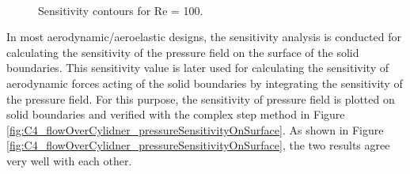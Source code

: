 \begin{figure}[H]
    \centering
    \quad
    \\
    \caption{Sensitivity contours for Re = 100.}
    \label{fig:C4_flowOverCylinderSensitivityContour}
\end{figure}

In most aerodynamic/aeroelastic designs, the sensitivity analysis is conducted for calculating the sensitivity of the pressure field on the surface of the solid boundaries. This sensitivity value is later used for calculating the sensitivity of aerodynamic forces acting of the solid boundaries by integrating the sensitivity of the pressure field. For this purpose, the sensitivity of pressure field is plotted on solid boundaries and verified with the complex step method in Figure \ref{fig:C4_flowOverCylidner_pressureSensitivityOnSurface}. As shown in Figure \ref{fig:C4_flowOverCylidner_pressureSensitivityOnSurface}, the two results agree very well with each other.

